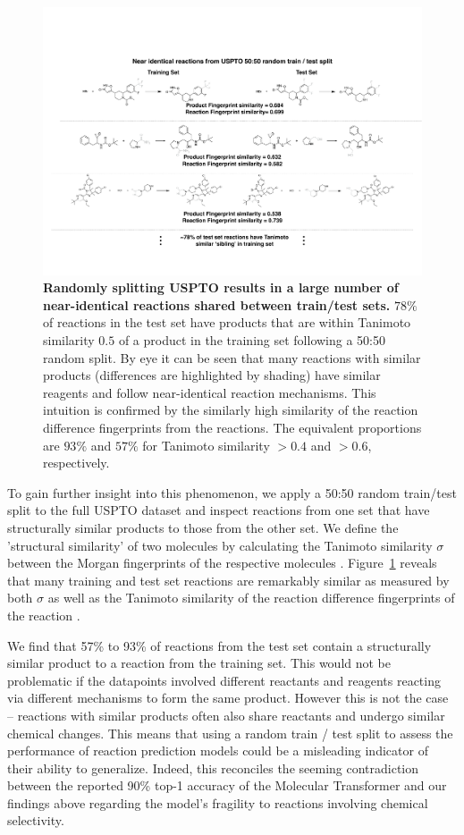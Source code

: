 \begin{figure}[ht!]
    \centering
    \includegraphics[width=\textwidth]{Chapters/Transformer/Figs/siblings_alt.pdf}
    \caption{\label{fig:sibling} \textbf{Randomly splitting USPTO results in a large number of near-identical reactions shared between train/test sets.}  $78\%$ of reactions in the test set have products that are within Tanimoto similarity $0.5$ of a product in the training set following a 50:50 random split. By eye it can be seen that many reactions with similar products (differences are highlighted by shading) have similar reagents and follow near-identical reaction mechanisms. This intuition is confirmed by the similarly high similarity of the reaction difference fingerprints from the reactions. The equivalent proportions are $93\%$ and $57\%$ for Tanimoto similarity $>0.4$ and $>0.6$, respectively.}
\end{figure}

To gain further insight into this phenomenon, we apply a 50:50 random train/test split to the full USPTO dataset and inspect reactions from one set that have structurally similar products to those from the other set. We define the 'structural similarity' of two molecules by calculating the Tanimoto similarity $\sigma$ between the Morgan fingerprints of the respective molecules \cite{Bajusz2015Tanimoto}. Figure~\ref{fig:sibling} reveals that many training and test set reactions are remarkably similar as measured by both $\sigma$ as well as the Tanimoto similarity of the reaction difference fingerprints of the reaction \cite{Schneider2015rxnfp}.

We find that 57\% to 93\% of reactions from the test set contain a structurally similar product to a reaction from the training set. This would not be problematic if the datapoints involved different reactants and reagents reacting via different mechanisms to form the same product. However this is not the case -- reactions with similar products often also share reactants and undergo similar chemical changes. This means that using a random train / test split to assess the performance of reaction prediction models could be a misleading indicator of their ability to generalize. Indeed, this reconciles the seeming contradiction between the reported 90\% top-1 accuracy of the Molecular Transformer and our findings above regarding the model's fragility to reactions involving chemical selectivity.

